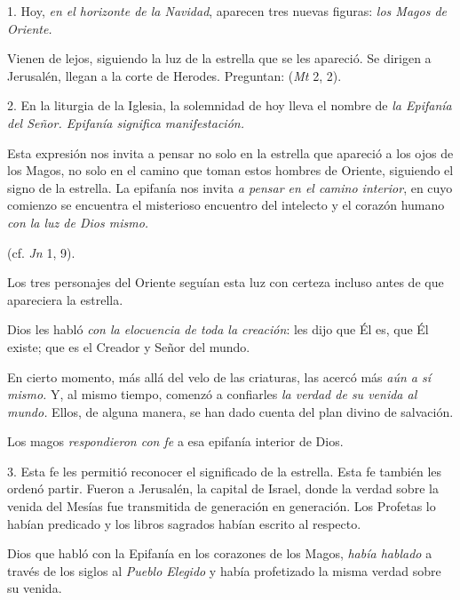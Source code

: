 				\begin{body}
					1. Hoy, \emph{en el horizonte de la Navidad}, aparecen tres nuevas figuras: \emph{los Magos de Oriente.}
					
					Vienen de lejos, siguiendo la luz de la estrella que se les apareció. Se dirigen a Jerusalén, llegan a la corte de Herodes. Preguntan:  (\emph{Mt} 2, 2).
					
					2. En la liturgia de la Iglesia, la solemnidad de hoy lleva el nombre de \emph{la Epifanía del Señor. Epifanía significa manifestación.}
					
					Esta expresión nos invita a pensar no solo en la estrella que apareció a los ojos de los Magos, no solo en el camino que toman estos hombres de Oriente, siguiendo el signo de la estrella. La epifanía nos invita \emph{a pensar en el camino interior}, en cuyo comienzo se encuentra el misterioso encuentro del intelecto y el corazón humano \emph{con la luz de Dios mismo.}
					
					 (cf. \emph{Jn} 1, 9).
					
					Los tres personajes del Oriente seguían esta luz con certeza incluso antes de que apareciera la estrella.
					
					Dios les habló \emph{con la elocuencia de toda la creación}: les dijo que Él es, que Él existe; que es el Creador y Señor del mundo.
					
					En cierto momento, más allá del velo de las criaturas, las acercó más \emph{aún a sí mismo.} Y, al mismo tiempo, comenzó a confiarles \emph{la verdad de su venida al mundo.} Ellos, de alguna manera, se han dado cuenta del plan divino de salvación.
					
					Los magos \emph{respondieron con fe} a esa epifanía interior de Dios.
					
					3. Esta fe les permitió reconocer el significado de la estrella. Esta fe también les ordenó partir. Fueron a Jerusalén, la capital de Israel, donde la verdad sobre la venida del Mesías fue transmitida de generación en generación. Los Profetas lo habían predicado y los libros sagrados habían escrito al respecto.
					
					Dios que habló con la Epifanía en los corazones de los Magos, \emph{había hablado} a través de los siglos al \emph{Pueblo Elegido} y había profetizado la misma verdad sobre su venida.
					

\end{body}
